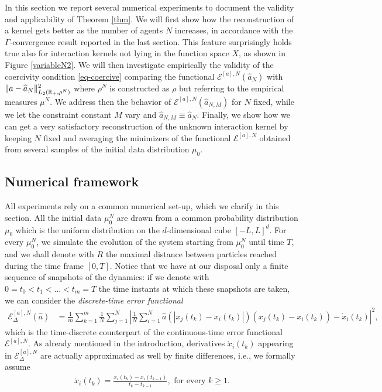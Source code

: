 In this section we report several numerical experiments to document the validity and applicability of Theorem \ref{thm}. We will first show how the reconstruction of a kernel gets better as the number of agents $N$ increases, in accordance with the $\Gamma$-convergence result reported in the last section. This feature surprisingly holds true also for interaction kernels not lying in the function space $X$, as shown in Figure \ref{variableN2}. We will then investigate empirically the validity of the coercivity condition \eqref{eq-coercive} comparing the functional $\mathcal E^{[a],N}(\widehat a_N)$ with $\|a - \widehat a_N\|_{L_2(\mathbb{R}_+,\rho^N)}^2$ where $\rho^N$ is constructed as $\rho$ but referring to the empirical measures $\mu^N$. We address then the behavior of $\mathcal E^{[a],N}(\widehat a_{N,M})$ for $N$ fixed, while we let the constraint constant  $M$ vary and $\widehat a_{N,M}\equiv\widehat a_{N}$. Finally, we show how we can get a very satisfactory reconstruction of the unknown interaction kernel by keeping $N$ fixed and averaging the minimizers of the functional $\mathcal E^{[a],N}$ obtained from several samples of the initial data distribution $\mu_0$.

\subsection{Numerical framework}\label{numfram}

All experiments  rely on a common numerical set-up, which we clarify in this section. All the initial data $\mu^N_0$ are drawn from a common probability distribution $\mu_0$ which is the uniform distribution on the $d$-dimensional cube $[-L,L]^d$. For every $\mu^N_0$, we simulate the evolution of the system starting from $\mu^N_0$ until time $T$, and we shall denote with $R$ the maximal distance between particles reached during the time frame $[0,T]$. Notice that we have at our disposal only a finite sequence of snapshots of the dynamics: if we denote with $0 = t_0 < t_1 < \ldots < t_m = T$ the time instants at which these snapshots are taken, we can consider the \textit{discrete-time error functional}
\begin{align*}
\mathcal{E}^{[a],N}_\Delta(\widehat{a}) & = \frac{1}{m} \sum^m_{k = 1} \frac{1}{N} \sum^N_{j = 1} \left| \frac{1}{N} \sum^N_{i = 1} \widehat{a}(|x_j(t_k) - x_i(t_k)|)(x_j(t_k) - x_i(t_k)) - \dot{x}_i(t_k)\right|^2,
\end{align*}
which is the time-discrete counterpart of the continuous-time error functional $\mathcal{E}^{[a],N}$. As already mentioned in the introduction, derivatives $\dot{x}_i(t_k)$ appearing in $\mathcal{E}^{[a],N}_\Delta$ are actually approximated as well by finite differences, i.e., we formally assume
\begin{align*}
\dot{x}_i(t_k) = \frac{x_i(t_k) - x_i(t_{k-1})}{t_k - t_{k-1}}, \text{ for every } k \geq 1.
\end{align*}

